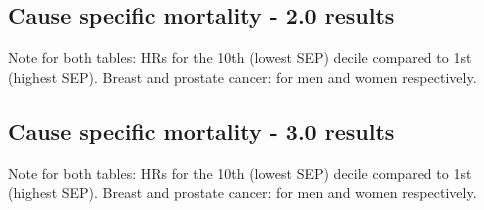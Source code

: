 \documentclass[a4paper, notitlepage, fleqn]{article} %
\begin{document}
\newpage
\subsection{Cause specific mortality - 2.0 results}
\begin{stlog}\end{stlog}
Note for both tables: HRs for the 10th (lowest SEP) decile compared to 1st (highest SEP). 
Breast and prostate cancer: for men and women respectively. 

\newpage
\subsection{Cause specific mortality - 3.0 results}
\begin{stlog}\end{stlog}
Note for both tables: HRs for the 10th (lowest SEP) decile compared to 1st (highest SEP). 
Breast and prostate cancer: for men and women respectively. 
\end{document}
